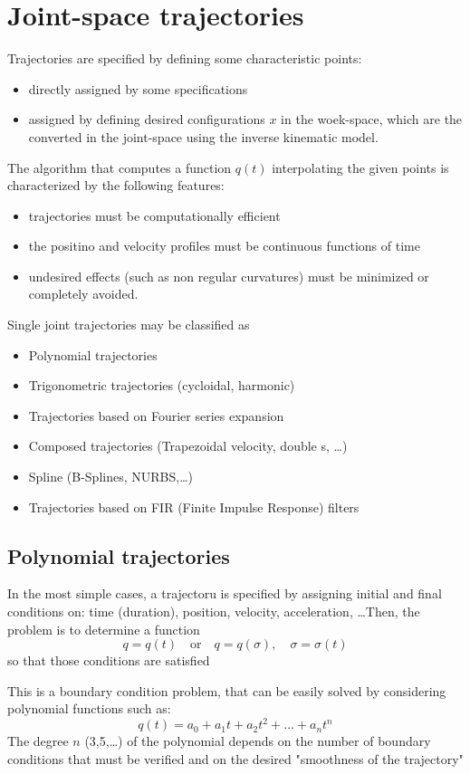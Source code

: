 \documentclass{book}
\begin{document}
\section{Joint-space trajectories}
Trajectories are specified by defining some characteristic points:
\begin{itemize}
    \item directly assigned by some specifications
    \item assigned by defining desired configurations $x$ in the woek-space, which are the converted in the joint-space using the inverse kinematic model.
\end{itemize}
The algorithm that computes a function $q(t)$ interpolating the given points is characterized by the following features:
\begin{itemize}
    \item trajectories must be computationally efficient 
    \item the positino and velocity profiles must be continuous functions of time 
    \item undesired effects (such as non regular curvatures) must be minimized or completely avoided. 
\end{itemize}
Single joint trajectories may be classified as 
\begin{itemize}
    \item Polynomial trajectories 
    \item Trigonometric trajectories (cycloidal, harmonic)
    \item Trajectories based on Fourier series expansion 
    \item Composed trajectories (Trapezoidal velocity, double s, \dots)
    \item Spline (B-Splines, NURBS,\dots)
    \item Trajectories based on FIR (Finite Impulse Response) filters
\end{itemize}

\subsection{Polynomial trajectories}
In the most simple cases, a trajectoru is specified by assigning initial and final conditions on: time (duration), position, velocity, acceleration, \dots Then, the problem is to determine a function 
\[
    q=q(t) \quad \text{or} \quad q=q(\sigma), \quad \sigma=\sigma(t)
\]
so that those conditions are satisfied 

This is a boundary condition problem, that can be easily solved by considering polynomial functions such as: 
\[
    q(t)=a_0+a_1t+a_2t^2+\dots+a_nt^n
\]
The degree $n$ (3,5,\dots) of the polynomial depends on the number of boundary conditions that must be verified and on the desired "smoothness of the trajectory"
\end{document}
